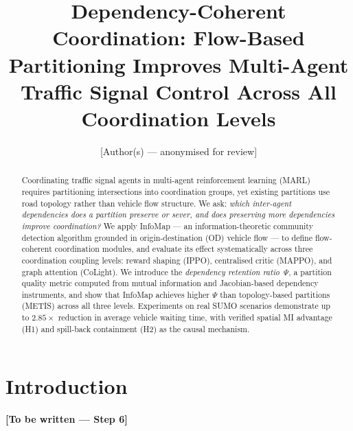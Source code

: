 \documentclass{article}
\title{Dependency-Coherent Coordination: Flow-Based Partitioning Improves
    Multi-Agent Traffic Signal Control Across All Coordination Levels}
\author{%
  [Author(s) — anonymised for review]
}
\begin{document}
\maketitle

\begin{abstract}
%
Coordinating traffic signal agents in multi-agent reinforcement learning
(MARL) requires partitioning intersections into coordination groups, yet
existing partitions use road topology rather than vehicle flow structure.
We ask: \emph{which inter-agent dependencies does a partition preserve or
    sever, and does preserving more dependencies improve coordination?}
We apply InfoMap — an information-theoretic community detection algorithm
grounded in origin-destination (OD) vehicle flow — to define
flow-coherent coordination modules, and evaluate its effect systematically
across three coordination coupling levels: reward shaping (IPPO), centralised
critic (MAPPO), and graph attention (CoLight).
We introduce the \emph{dependency retention ratio}~$\Psi$, a partition quality
metric computed from mutual information and Jacobian-based dependency
instruments, and show that InfoMap achieves higher $\Psi$ than topology-based
partitions (METIS) across all three levels.
Experiments on real SUMO scenarios demonstrate up to $2.85\times$ reduction in
average vehicle waiting time, with verified spatial MI advantage (H1) and
spill-back containment (H2) as the causal mechanism.
\end{abstract}

\section{Introduction}
\label{sec:intro}
\textbf{[To be written — Step 6]}
\end{document}
